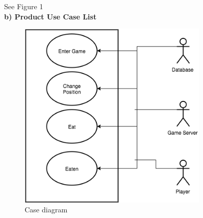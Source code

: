 \documentclass[12pt]{article}
\begin{document}
See Figure 1\\
\textbf{b) Product Use Case List}
\begin{figure}[H]
\centering
\includegraphics[width=90mm]{SRScase.png}
\caption{Case diagram \label{overflow}}
\end{figure}
\end{document}
